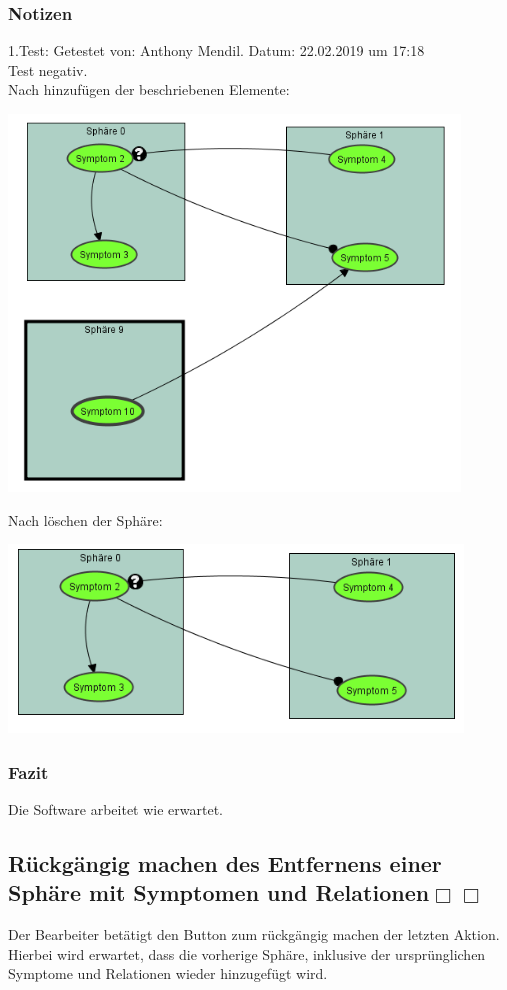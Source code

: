 \documentclass{scrartcl}
\newcommand{\subsectiont}[2]{\subsection[#1]{#1{\normalsize\normalfont #2}}}
\newcommand{\leer}{$\Box$}
\begin{document}
\subsubsection{Notizen}
1.Test: Getestet von: Anthony Mendil. Datum: 22.02.2019 um 17:18 \\
Test negativ. \\
Nach hinzufügen der beschriebenen Elemente: 
\begin{center}
\includegraphics[height=10cm]{2_10vorher.PNG}
\end{center}
Nach löschen der Sphäre: 
\begin{center}
\includegraphics[height=5cm]{2_10nachher.PNG}
\end{center}
\subsubsection{Fazit}
Die Software arbeitet wie erwartet. 

\subsectiont{Rückgängig machen des Entfernens einer Sphäre mit Symptomen und Relationen}{\dotfill\XBox\leer\leer}
Der Bearbeiter betätigt den Button zum rückgängig machen der letzten Aktion. Hierbei wird erwartet, dass die vorherige Sphäre, inklusive der ursprünglichen Symptome und Relationen wieder hinzugefügt wird. 
\end{document}
